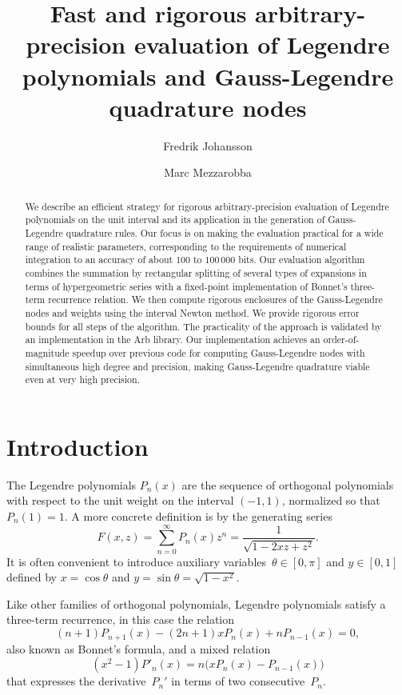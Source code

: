 \documentclass{siamart0216}
\begin{document}
\title{Fast and rigorous arbitrary-precision evaluation of Legendre
polynomials and Gauss-Legendre quadrature nodes}
\author{Fredrik Johansson \and Marc Mezzarobba}
\date{}
\maketitle

\begin{abstract}
We describe an efficient strategy for rigorous
arbitrary-precision evaluation of Legendre polynomials on the unit
interval and its application in the generation of Gauss-Legendre
quadrature rules.
Our focus is on making the evaluation practical for a wide range of
realistic parameters, corresponding to the requirements of numerical
integration to an accuracy of about $100$ to $100\,000$ bits.
Our evaluation algorithm combines the summation by rectangular
splitting of several types of expansions in terms of hypergeometric
series with a fixed-point implementation of Bonnet's three-term
recurrence relation.
We then compute rigorous enclosures of the Gauss-Legendre nodes and
weights using the interval Newton method.
We provide rigorous error bounds for all steps of the algorithm.
The practicality of the approach is validated by an implementation in
the Arb library.
Our implementation achieves an order-of-magnitude speedup over
previous code for computing Gauss-Legendre nodes with simultaneous
high degree and precision, making Gauss-Legendre quadrature viable
even at very high precision.
\end{abstract}

\section{Introduction}

The Legendre polynomials $P_n(x)$ are the sequence
of orthogonal polynomials with respect to the unit weight
on the interval $(-1,1)$, normalized so that $P_n(1) = 1$.
A more concrete definition is by the generating series
\begin{equation} \label{eq:generating-series}
  F(x, z)
  = \sum_{n=0}^{\infty} P_n(x) z^n
  = \frac{1}{\sqrt{1 - 2 x z + z^2}}.
\end{equation}
It is often convenient to introduce auxiliary
variables~$\theta \in [0, \pi]$ and $y \in [0, 1]$ defined by
$x = \cos \theta$ and $y = \sin \theta = \sqrt{1 - x^2}$.

Like other families of orthogonal polynomials, Legendre polynomials
satisfy a three-term recurrence, in this case the relation
\begin{equation} \label{eq:recurrence}
  (n + 1) P_{n+1}(x) - (2n + 1) x P_n(x) + n P_{n-1}(x) = 0,
\end{equation}
also known as Bonnet's formula, and a mixed relation
\begin{equation} \label{eq:mixed}
  (x^2 - 1) P'_n(x) = n \bigl( x P_n(x) - P_{n-1}(x) \bigl)
\end{equation}
that expresses the derivative $P_n'$ in terms of two
consecutive $P_n$.
\end{document}
